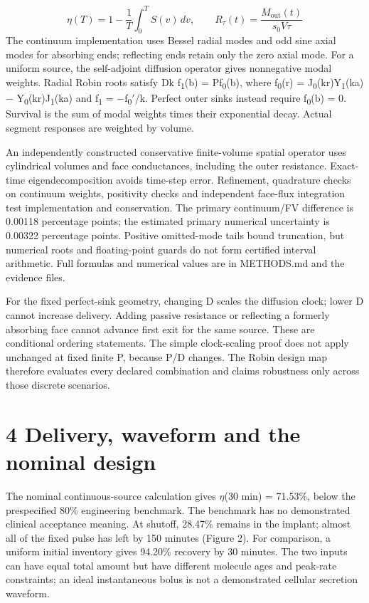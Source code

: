 \documentclass[11pt]{article}
\begin{document}
\begin{equation}\eta(T)=1-\frac{1}{T}\int_0^T S(v)\,dv,\qquad R_\tau(t)=\frac{M_{\mathrm{out}}(t)}{s_0V\tau}\end{equation}
The continuum implementation uses Bessel radial modes and odd sine axial modes for absorbing ends; reflecting ends retain only the zero axial mode. For a uniform source, the self-adjoint diffusion operator gives nonnegative modal weights. Radial Robin roots satisfy Dk f\textsubscript{1}(b) = Pf\textsubscript{0}(b), where f\textsubscript{0}(r) = J\textsubscript{0}(kr)Y\textsubscript{1}(ka) \ensuremath{-} Y\textsubscript{0}(kr)J\textsubscript{1}(ka) and f\textsubscript{1} = \ensuremath{-}f\textsubscript{0}\ensuremath{\prime}/k. Perfect outer sinks instead require f\textsubscript{0}(b) = 0. Survival is the sum of modal weights times their exponential decay. Actual segment responses are weighted by volume.

An independently constructed conservative finite-volume spatial operator uses cylindrical volumes and face conductances, including the outer resistance. Exact-time eigendecomposition avoids time-step error. Refinement, quadrature checks on continuum weights, positivity checks and independent face-flux integration test implementation and conservation. The primary continuum/FV difference is 0.00118 percentage points; the estimated primary numerical uncertainty is 0.00322 percentage points. Positive omitted-mode tails bound truncation, but numerical roots and floating-point guards do not form certified interval arithmetic. Full formulas and numerical values are in METHODS.md and the evidence files.

For the fixed perfect-sink geometry, changing D scales the diffusion clock; lower D cannot increase delivery. Adding passive resistance or reflecting a formerly absorbing face cannot advance first exit for the same source. These are conditional ordering statements. The simple clock-scaling proof does not apply unchanged at fixed finite P, because P/D changes. The Robin design map therefore evaluates every declared combination and claims robustness only across those discrete scenarios.

\section*{4 Delivery, waveform and the nominal design}
The nominal continuous-source calculation gives \ensuremath{\eta}(30 min) = 71.53\%, below the prespecified 80\% engineering benchmark. The benchmark has no demonstrated clinical acceptance meaning. At shutoff, 28.47\% remains in the implant; almost all of the fixed pulse has left by 150 minutes (Figure 2). For comparison, a uniform initial inventory gives 94.20\% recovery by 30 minutes. The two inputs can have equal total amount but have different molecule ages and peak-rate constraints; an ideal instantaneous bolus is not a demonstrated cellular secretion waveform.
\end{document}
